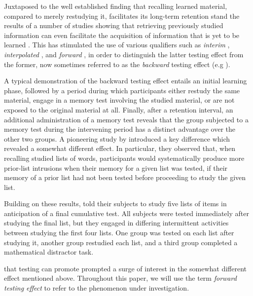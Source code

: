 \documentclass[../main.tex]{subfiles}
\begin{document}
Juxtaposed to the well established finding that recalling learned material, compared to merely restudying it, facilitates its long-term retention \citep{roedigeriiiPowerTestingMemory2006, roedigeriiiTestEnhancedLearningTaking2006, rowlandEffectTestingRestudy2014, adesopeRethinkingUseTests2017, roedigeriiiCriticalRoleRetrieval2011, gloverTestingPhenomenonNot1989} stand the results of a number of studies showing that retrieving previously studied information can even facilitate the acquisition of information that is yet to be learned \citep{chanRetrievalPotentiatesNew2018a, yangEnhancingLearningRetrieval2018}. This has stimulated the use of various qualifiers such as \textit{interim} \citep{wissmanInterimTestEffect2011}, \textit{interpolated} \citep{szpunarInterpolatedMemoryTests2013}, and \textit{forward} \citep{pastotterRetrievalPracticeEnhances2014,yangEnhancingLearningRetrieval2018}, in order to distinguish the latter testing effect from the former, now sometimes referred to as the \textit{backward} testing effect (e.g \citealp{yangEnhancingLearningRetrieval2018}). 

A typical demonstration of the backward testing effect entails an initial learning phase, followed by a period during which participants either restudy the same material, engage in a memory test involving the studied material, or are not exposed to the original material at all. Finally, after a retention interval, an additional administration of a memory test reveals that the group subjected to a memory test during the intervening period has a distinct advantage over the other two groups. A pioneering study by \cite{darleyEffectsPriorFree1971} introduced a key difference which revealed a somewhat different effect. In particular, they observed that, when recalling studied lists of words, participants would systematically produce more prior-list intrusions when their memory for a given list was tested, if their memory of a prior list had not been tested before proceeding to study the given list. 

Building on these results, \cite{szpunarTestingStudyInsulates2008} told their subjects to study five lists of items in anticipation of a final cumulative test. All subjects were tested immediately after studying the final list, but they engaged in differing intermittent activities between studying the first four lists. One group was tested on each list after studying it, another group restudied each list, and a third group completed a mathematical distractor task.


that testing can promote  prompted a surge of interest in the somewhat different effect mentioned above.   Throughout this paper, we will use the term \textit{forward testing effect} to refer to the phenomenon under investigation. 
\end{document}
